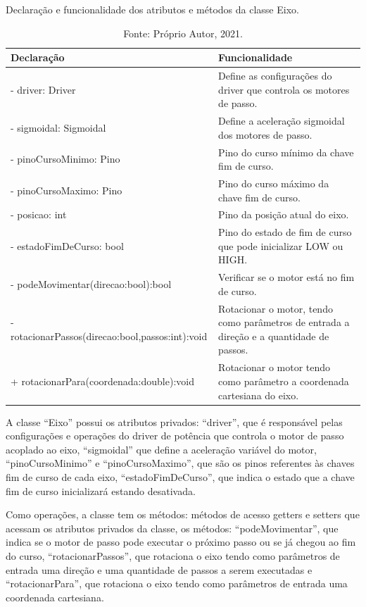 
\begin{table}
    \centering
    \caption{Declaração e funcionalidade dos atributos e métodos da classe Eixo.}
    \begin{tabular}{lp{6cm}}
        \hline
        \textbf{Declaração} & \textbf{Funcionalidade}\\
        \hline
        - driver: Driver & Define as configurações do driver que controla os motores de passo.\\
        - sigmoidal: Sigmoidal & Define a aceleração sigmoidal dos motores de passo.\\
        - pinoCursoMinimo: Pino & Pino do curso mínimo da chave fim de curso.\\
        - pinoCursoMaximo: Pino & Pino do curso máximo da chave fim de curso.\\
        - posicao: int & Pino da posição atual do eixo.\\
        - estadoFimDeCurso: bool & Pino do estado de fim de curso que pode inicializar LOW ou HIGH.\\
        - podeMovimentar(direcao:bool):bool & Verificar se o motor está no fim de curso.\\
        - rotacionarPassos(direcao:bool,passos:int):void & Rotacionar o motor, tendo como parâmetros de entrada a direção e a quantidade de passos.\\
        + rotacionarPara(coordenada:double):void & Rotacionar o motor tendo como parâmetro a coordenada cartesiana do eixo.\\
        \hline       
    \end{tabular}
    \caption*{Fonte: Próprio Autor, 2021.}
    \label{tab:classeeixo}
\end{table}

A classe “Eixo” possui os atributos privados: “driver”, que é responsável pelas configurações e operações 
do driver de potência que controla o motor de passo acoplado ao eixo, “sigmoidal” que define a aceleração 
variável do motor, “pinoCursoMinimo” e “pinoCursoMaximo”, que são os pinos referentes às chaves fim de 
curso de cada eixo, “estadoFimDeCurso”, que indica o estado que a chave fim de curso inicializará estando 
desativada. 

Como operações, a classe tem os métodos: métodos de acesso getters e setters que acessam os atributos 
privados da classe, os métodos: “podeMovimentar”, que indica se o motor de passo pode executar o próximo 
passo ou se já chegou ao fim do curso, “rotacionarPassos”, que rotaciona o eixo tendo como parâmetros de 
entrada uma direção e uma quantidade de passos a serem executadas e “rotacionarPara”, que rotaciona o 
eixo tendo como parâmetros de entrada uma coordenada cartesiana.

